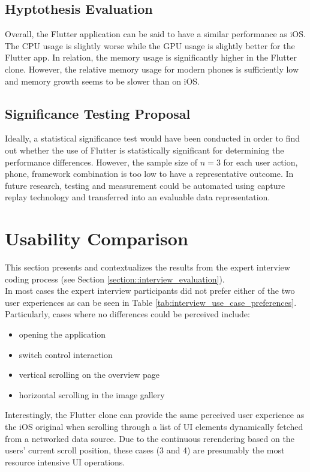 \subsection{Hyptothesis Evaluation}
Overall, the Flutter application can be said to have a similar performance as iOS. The CPU usage is slightly worse while the GPU usage is slightly better for the Flutter app.
In relation, the memory usage is significantly higher in the Flutter clone. However, the relative memory usage for modern phones is sufficiently low and memory growth seems to be slower than
on iOS.


\subsection{Significance Testing Proposal}
Ideally, a statistical significance test would have been conducted in order to find out whether the use of Flutter is statistically significant for 
determining the performance differences.
However, the sample size of $n=3$ for each user action, phone, framework combination is too low to have a representative outcome.
In future research, testing and measurement could be automated using capture replay technology and transferred into an evaluable data representation.

\section{Usability Comparison} \label{section::usability_comparison}
This section presents and contextualizes the results from the expert interview coding process (see Section \ref{section::interview_evaluation}).\\
In most cases the expert interview participants did not prefer either of the two user experiences as can be seen in Table \ref{tab:interview_use_case_preferences}.
Particularly, cases where no differences could be perceived include:
\begin{itemize}
    \item opening the application
    \item switch control interaction
    \item vertical scrolling on the overview page
    \item horizontal scrolling in the image gallery
\end{itemize}
Interestingly, the Flutter clone can provide the same perceived user experience as the iOS original when scrolling through a list of UI elements dynamically fetched from a networked data source.
Due to the continuous rerendering based on the users' current scroll position, these cases (3 and 4) are presumably the most resource intensive UI operations.

